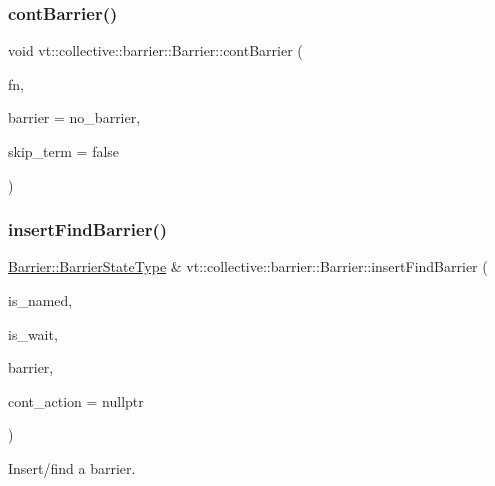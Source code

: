 \subsubsection{\texorpdfstring{cont\+Barrier()}{contBarrier()}}
{\footnotesize\ttfamily void vt\+::collective\+::barrier\+::\+Barrier\+::cont\+Barrier (\begin{DoxyParamCaption}\item[{\hyperlink{namespacevt_ae0a5a7b18cc99d7b732cb4d44f46b0f3}{Action\+Type}}]{fn,  }\item[{\hyperlink{namespacevt_a25e481f0d6bbc7204db23d1c87a62e77}{Barrier\+Type} const \&}]{barrier = {\ttfamily no\+\_\+barrier},  }\item[{bool const}]{skip\+\_\+term = {\ttfamily false} }\end{DoxyParamCaption})\hspace{0.3cm}{\ttfamily [private]}}

\mbox{\label{structvt_1_1collective_1_1barrier_1_1_barrier_aa3f74f986e523701c1d85ed97d3ad5a4}} 
\subsubsection{\texorpdfstring{insert\+Find\+Barrier()}{insertFindBarrier()}}
{\footnotesize\ttfamily \hyperlink{structvt_1_1collective_1_1barrier_1_1_barrier_a9b612818f7b44ca65f2caee0dee094f3}{Barrier\+::\+Barrier\+State\+Type} \& vt\+::collective\+::barrier\+::\+Barrier\+::insert\+Find\+Barrier (\begin{DoxyParamCaption}\item[{bool const \&}]{is\+\_\+named,  }\item[{bool const \&}]{is\+\_\+wait,  }\item[{\hyperlink{namespacevt_a25e481f0d6bbc7204db23d1c87a62e77}{Barrier\+Type} const \&}]{barrier,  }\item[{\hyperlink{namespacevt_ae0a5a7b18cc99d7b732cb4d44f46b0f3}{Action\+Type}}]{cont\+\_\+action = {\ttfamily nullptr} }\end{DoxyParamCaption})}



Insert/find a barrier. 


